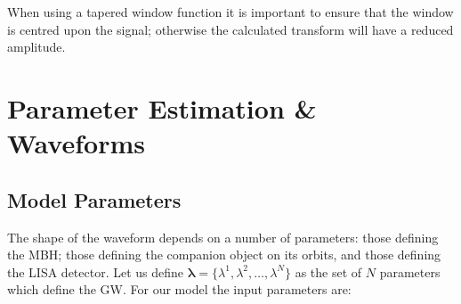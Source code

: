 When using a tapered window function it is important to ensure that the window is centred upon the signal; otherwise the calculated transform will have a reduced amplitude.

\section{Parameter Estimation \& Waveforms}

\subsection{Model Parameters}\label{sec:Parameters}

The shape of the waveform depends on a number of parameters: those defining the MBH; those defining the companion object on its orbits, and those defining the LISA detector. Let us define $\boldsymbol{\lambda} = \{\lambda^1, \lambda^2, \ldots, \lambda^N\}$ as the set of $N$ parameters which define the GW. For our model the input parameters are:
